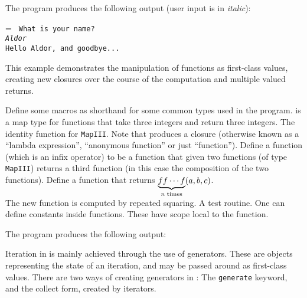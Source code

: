 The program produces the following output (user input is in {\it italic}):
\begin{flushleft}\small\leftskip=\baseLeftSkip
\tt
What is your name?	\\
{\it Aldor}	\\
Hello Aldor, and goodbye...
\end{flushleft}

\newpage
{}

This example demonstrates the manipulation of functions as first-class
values, creating new closures over the course of the computation and
multiple valued returns.


\begin{description}
 Define some macros as shorthand for some common types
used in the program.  is a map type for functions that
take three integers and return three integers.
 The identity function for {\tt MapIII}. Note that
\ttin{+->} produces a closure (otherwise known as a ``lambda expression'',
``anonymous function'' or just ``function'').
 Define a function \ttin{*} (which is an infix operator)
to be a function that given two functions (of type {\tt MapIII})
returns a third function (in this case the composition of the two
functions).
 Define a function that returns 
$\underbrace{f f \cdots f}_{n \; {\rm times}} (a,b,c)$. \\
The new function is computed by repeated squaring.
 A test routine.
 One can define constants inside functions. These have
scope local to the function.
\end{description}

The program produces the following output:


\newpage
{}

Iteration in \asharp{} is mainly achieved through the use of
generators. These are objects representing the state of an iteration,
and may be passed around as first-class values. There are two ways of
creating generators in \asharp{}: The {\tt generate} keyword, and the
collect form, created by iterators.

